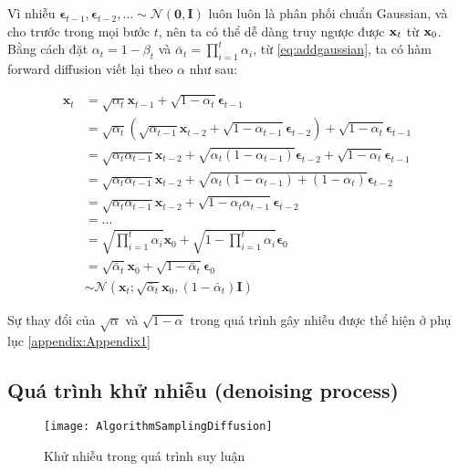 Vì nhiễu $\boldsymbol{\epsilon}_{t-1}, \boldsymbol{\epsilon}_{t-2}, \dots \sim \mathcal{N}(\mathbf{0}, \mathbf{I})$ luôn luôn là phân phối chuẩn Gaussian, và cho trước trong mọi bước $t$, nên ta có thể dễ dàng truy ngược được $\mathbf{x}_t$ từ $\mathbf{x}_0$. Bằng cách đặt $\alpha_t = 1 - \beta_t$ và $\bar{\alpha}_t = \prod_{i=1}^t \alpha_i$, từ \autoref{eq:addgaussian}, ta có hàm forward diffusion viết lại theo $\alpha$ như sau:

\begin{equation}
\begin{aligned}
	\boldsymbol{x}_t &= \sqrt{\alpha_t}\boldsymbol{x}_{t-1} + \sqrt{1 - \alpha_t}\boldsymbol{\epsilon}_{t-1} \\
	&= \sqrt{\alpha_t}\left(\sqrt{\alpha_{t-1}}\boldsymbol{x}_{t-2} + \sqrt{1 - \alpha_{t-1}}\boldsymbol{\epsilon}_{t-2}\right) + \sqrt{1 - \alpha_t}\boldsymbol{\epsilon}_{t-1} \\
	&= \sqrt{\alpha_t\alpha_{t-1}}\boldsymbol{x}_{t-2} + \sqrt{\alpha_t(1 - \alpha_{t-1})}\boldsymbol{\epsilon}_{t-2} + \sqrt{1 - \alpha_t}\boldsymbol{\epsilon}_{t-1} \\
	&= \sqrt{\alpha_t\alpha_{t-1}}\boldsymbol{x}_{t-2} + \sqrt{\alpha_t(1 - \alpha_{t-1}) + (1 - \alpha_t)}\boldsymbol{\epsilon}_{t-2} \\
	&= \sqrt{\alpha_t\alpha_{t-1}}\boldsymbol{x}_{t-2} + \sqrt{1 - \alpha_t\alpha_{t-1}}\boldsymbol{\epsilon}_{t-2} \\
	&= \ldots \\
	&= \sqrt{\prod_{i=1}^t \alpha_i} \boldsymbol{x}_0 + \sqrt{1 - \prod_{i=1}^t \alpha_i} \boldsymbol{\epsilon}_0 \\
	&= \sqrt{\bar{\alpha}_t} \boldsymbol{x}_0 + \sqrt{1 - \bar{\alpha}_t} \boldsymbol{\epsilon}_0 \\
	&\sim \mathcal{N}\left(\boldsymbol{x}_t; \sqrt{\bar{\alpha}_t} \boldsymbol{x}_0, \left(1 - \bar{\alpha}_t\right) \textbf{I}\right)
\end{aligned}
\label{eq:tracexzero}
\end{equation}

Sự thay đổi của $\sqrt{\alpha}$ và  $\sqrt{1- \alpha}$ trong quá trình gây nhiễu được thể hiện ở phụ lục \autoref{appendix:Appendix1}

\subsection{Quá trình khử nhiễu (denoising process)}
\label{subsection:denoising_process}

\begin{figure}[H]
	\centering
	\texttt{[image: AlgorithmSamplingDiffusion]}
	\caption{Khử nhiễu trong quá trình suy luận}
	\label{fig:AlgorithmSamplingDiffusion}
	\vspace{-5pt}
\end{figure}

